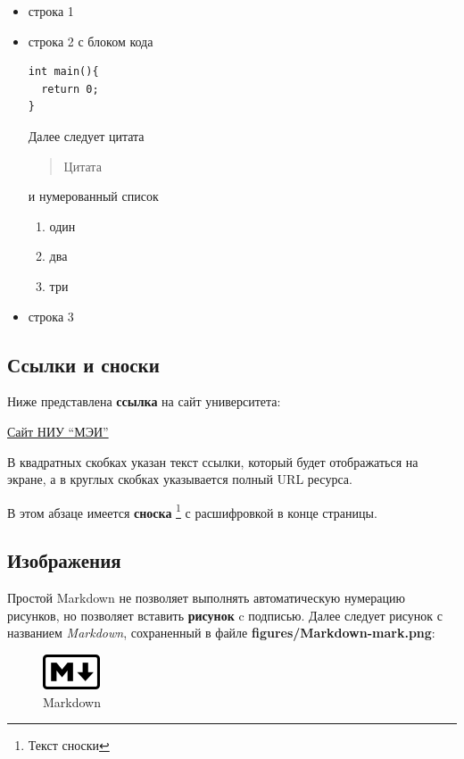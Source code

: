 \documentclass[
  a4paper,
]{book}
\providecommand{\tightlist}{%
  \setlength{\itemsep}{0pt}\setlength{\parskip}{0pt}}
\theoremstyle{definition}
\theoremstyle{definition}
\theoremstyle{definition}
\theoremstyle{definition}
\theoremstyle{remark}
\begin{document}
\begin{itemize}
\item
  строка 1
\item
  строка 2 с блоком кода

\begin{verbatim}
int main(){
  return 0;
}
\end{verbatim}

  Далее следует цитата

  \begin{quote}
  Цитата
  \end{quote}

  и нумерованный список

  \begin{enumerate}
  \def\labelenumi{\arabic{enumi}.}
  \tightlist
  \item
    один
  \item
    два
  \item
    три
  \end{enumerate}
\item
  строка 3
\end{itemize}

\hypertarget{markdown-syntax-links}{%
\subsection{Ссылки и сноски}\label{markdown-syntax-links}}

Ниже представлена \textbf{ссылка} на сайт университета:

\href{http://www.mpei.ru}{Сайт НИУ ``МЭИ''}

В квадратных скобках указан текст ссылки, который будет отображаться на экране, а в круглых скобках указывается полный URL ресурса.

В этом абзаце имеется \textbf{сноска} \footnote{Текст сноски} с расшифровкой в конце страницы.

\hypertarget{markdown-syntax-media}{%
\subsection{Изображения}\label{markdown-syntax-media}}

Простой Markdown не позволяет выполнять автоматическую нумерацию рисунков, но позволяет вставить \textbf{рисунок} c подписью. Далее следует рисунок с названием \emph{Markdown}, сохраненный в файле \textbf{figures/Markdown-mark.png}:

\begin{figure}
\centering
\includegraphics{figures/Markdown-mark.png}
\caption{Markdown}
\end{figure}
\end{document}
